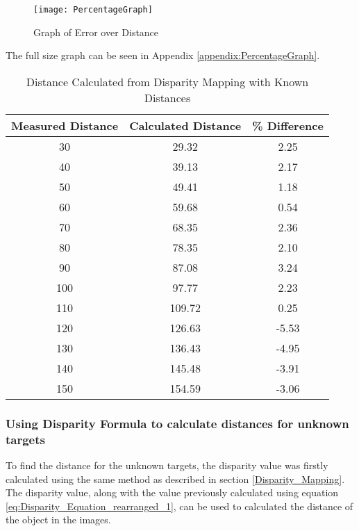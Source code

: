 \documentclass[conference]{IEEEtran}
\begin{document}
\begin{figure}[H]
\centerline{\texttt{[image: PercentageGraph]}}
\caption{Graph of Error over Distance}
\label{fig:PercentageGraph}
\end{figure}

The full size graph can be seen in Appendix \ref{appendix:PercentageGraph}.

\begin{table}
\begin{center}
\caption{Distance Calculated from Disparity Mapping with Known Distances}
\begin{tabular}{ || c || c || c || }
\hline
 Measured Distance & Calculated Distance & \% Difference\\ 
\hline
 30 & 29.32 & 2.25 \\  
\hline
 40 & 39.13 & 2.17 \\  
\hline
 50 & 49.41 & 1.18 \\  
\hline
 60 & 59.68 & 0.54 \\  
\hline
 70 & 68.35 & 2.36 \\  
\hline
 80 & 78.35 & 2.10 \\  
\hline
 90 & 87.08 & 3.24 \\  
\hline
 100 & 97.77 & 2.23 \\  
\hline
 110 & 109.72 & 0.25 \\  
\hline
 120 & 126.63 & -5.53 \\  
\hline
 130 & 136.43 & -4.95 \\  
\hline
 140 & 145.48 & -3.91 \\  
\hline
 150 & 154.59 & -3.06 \\  
\hline

\end{tabular}
\label{table:distance_values_for_known_values}
\end{center}
\end{table}

\subsubsection{Using Disparity Formula to calculate distances for unknown targets} 
To find the distance for the unknown targets, the disparity value was firstly calculated using the same method as described in section \ref{Disparity_Mapping}. The disparity value, along with the value previously calculated using equation \ref{eq:Disparity_Equation_rearranged_1}, can be used to calculated the distance of the object in the images. 
\end{document}
